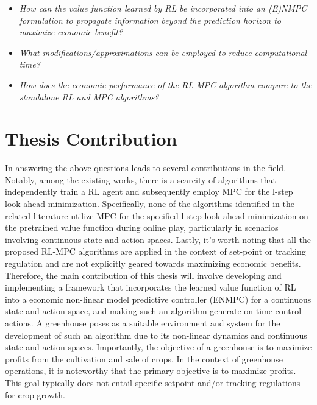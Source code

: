 \begin{itemize}[itemsep=7pt] %
	\item \textit{How can the value function learned by RL be incorporated into an (E)NMPC formulation to propagate information beyond the prediction horizon to maximize economic benefit?}
	\item \textit{What modifications/approximations can be employed to reduce computational time?}
	\item \textit{How does the economic performance of the RL-MPC algorithm compare to the standalone RL and MPC algorithms?}
\end{itemize}




\section{Thesis Contribution}

In answering the above questions leads to several contributions in the field. Notably, among the existing works, there is a scarcity of algorithms that independently train a RL agent and subsequently employ MPC for the l-step look-ahead minimization. Specifically, none of the algorithms identified in the related literature utilize MPC for the specified l-step look-ahead minimization on the pretrained value function during online play, particularly in scenarios involving continuous state and action spaces. Lastly, it's worth noting that all the proposed RL-MPC algorithms are applied in the context of set-point or tracking regulation and are not explicitly geared towards maximizing economic benefits.
Therefore, the main contribution of this thesis will involve developing and implementing a framework that incorporates the learned value function of RL into a economic non-linear model predictive controller (ENMPC) for a continuous state and action space, and making such an algorithm generate on-time control actions. A greenhouse poses as a suitable environment and system for the development of such an algorithm due to its non-linear dynamics and continuous state and action spaces. Importantly, the objective of a greenhouse is to maximize profits from the cultivation and sale of crops. In the context of greenhouse operations, it is noteworthy that the primary objective is to maximize profits. This goal typically does not entail specific setpoint and/or tracking regulations for crop growth.


